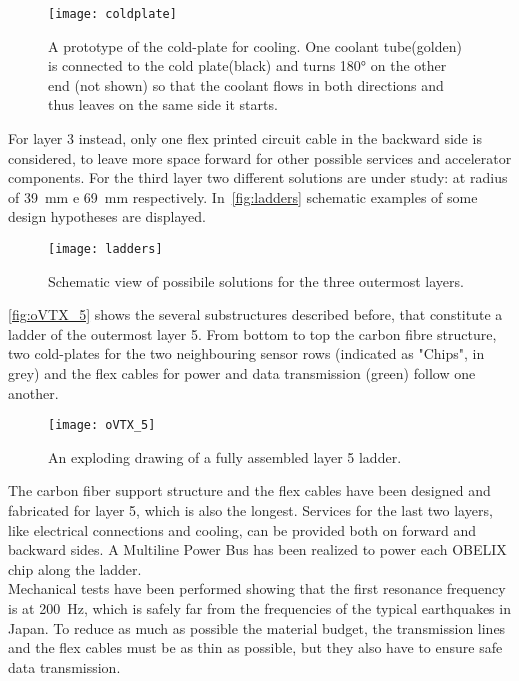 \begin{figure}[h!]
\centering
\texttt{[image: coldplate]}
\caption{A prototype of the cold-plate for cooling. One coolant tube(golden) is connected to the cold plate(black) and turns \ang{180} on the other end (not shown) so that the coolant flows in both directions and thus leaves on the same side it starts.}
\label{fig:oVTX_coldplate}
\end{figure}

For layer 3 instead, only one flex printed circuit cable in the backward side is considered, to leave more space forward for other possible services and accelerator components. For the third layer two different solutions are under study: at radius of \SI{39}{mm} e \SI{69}{mm} respectively. 
In~\autoref{fig:ladders} schematic examples of some design hypotheses are displayed. 

\begin{figure}[h!]
\centering
\texttt{[image: ladders]}
\caption{Schematic view of possibile solutions for the three outermost layers.}
\label{fig:ladders}
\end{figure}


\autoref{fig:oVTX_5} shows the several substructures described before, that constitute a ladder of the outermost layer 5. From bottom to top the carbon fibre structure, two cold-plates for the two neighbouring sensor rows (indicated as "Chips", in grey) and the flex cables for power and data transmission (green) follow one another. 


\begin{figure}[h!]
\centering
\texttt{[image: oVTX\_5]}
\caption{An exploding drawing of a fully assembled layer 5 ladder.}
\label{fig:oVTX_5}
\end{figure}


The carbon fiber support structure and the flex cables have been designed and fabricated for layer 5, which is also the longest. Services for the last two layers, like electrical connections and cooling, can be provided both on forward and backward sides.
A Multiline Power Bus has been realized to power each OBELIX chip along the ladder. \\

Mechanical tests have been performed showing that the first resonance frequency is at \SI{200}{Hz}, which is safely far from the frequencies of the typical earthquakes in Japan.
To reduce as much as possible the material budget, the transmission lines and the flex cables must be as thin as possible, but they also have to ensure safe data transmission.


